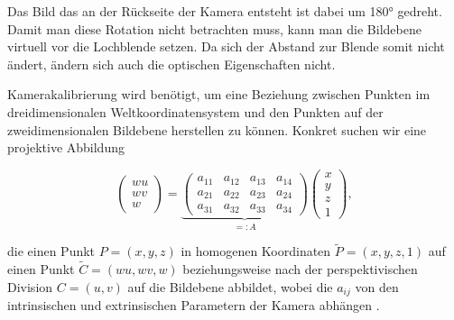 Das Bild das an der Rückseite der Kamera entsteht ist dabei um 180° gedreht. Damit man diese Rotation nicht betrachten muss, kann man die Bildebene virtuell vor die Lochblende setzen. Da sich der Abstand zur Blende somit nicht ändert, ändern sich auch die optischen Eigenschaften nicht.

Kamerakalibrierung wird benötigt, um eine Beziehung zwischen Punkten im dreidimensionalen Weltkoordinatensystem und den Punkten auf der zweidimensionalen Bildebene herstellen zu können. Konkret suchen wir eine projektive Abbildung

\begin{equation}\label{eq:projectionMat}
	\begin{pmatrix}
	wu \\wv \\w 
	\end{pmatrix} = 
		\underbrace{\begin{pmatrix}
		a_{11} & a_{12} & a_{13} & a_{14} \\
		a_{21} & a_{22} & a_{23} & a_{24} \\
		a_{31} & a_{32} & a_{33} & a_{34} 
		\end{pmatrix}}_{=:A}	\begin{pmatrix}
		x \\y \\z \\ 1 
		\end{pmatrix},
\end{equation}


die einen Punkt $P=(x,y,z)$ in homogenen Koordinaten $\tilde P = (x,y,z,1)$ auf einen Punkt $\tilde C = (wu,wv, w)$ beziehungsweise nach der perspektivischen Division $C = (u,v)$ auf die Bildebene abbildet, wobei die $a_{ij}$ von den intrinsischen und extrinsischen Parametern der Kamera abhängen \cite{Heikkila1997}.

